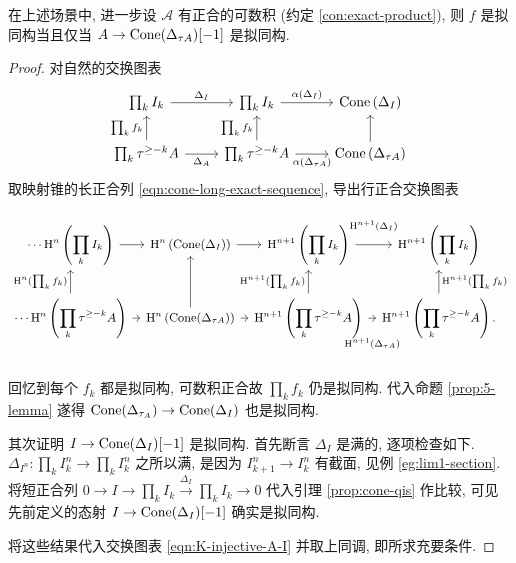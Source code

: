 \begin{lemma}\label{prop:K-injective-equiv}
	在上述场景中, 进一步设 $\mathcal{A}$ 有正合的可数积 (约定 \ref{con:exact-product}), 则 $f$ 是拟同构当且仅当 $A \to \operatorname{Cone}(\Delta_{\tau A})[-1]$ 是拟同构.
\end{lemma}
\begin{proof}
	对自然的交换图表
	\[\begin{tikzcd}
		\prod_k I_k \arrow[r, "\Delta_I"] & \prod_k I_k \arrow[r, "{\alpha(\Delta_I)}"] & \Cone\left(\Delta_I\right) \\
		\prod_k \tau^{\geq -k} A \arrow[r, "\Delta_A"'] \arrow[u, "{\prod_k f_k}"] & \prod_k \tau^{\geq -k} A \arrow[u, "{\prod_k f_k}"] \arrow[r, "{\alpha(\Delta_{\tau A})}"'] & \Cone\left( \Delta_{\tau A} \right) \arrow[u]
	\end{tikzcd}\]
	取映射锥的长正合列 \eqref{eqn:cone-long-exact-sequence}, 导出行正合交换图表
	\[\begin{tikzcd}
		[column sep=tiny, every cell/.append style = {font = \small}]
		\cdots \Hm^n\left( \displaystyle\prod_k I_k \right) \arrow[r] & \Hm^n\left( \Cone(\Delta_I) \right) \arrow[r] & \Hm^{n+1}\left( \displaystyle\prod_k I_k \right) \arrow[r, "{\Hm^{n+1}(\Delta_I)}" inner sep=1em] & \Hm^{n+1}\left( \displaystyle\prod_k I_k \right) \\
		\cdots \Hm^n\left( \displaystyle\prod_k \tau^{\geq -k} A \right) \arrow[r] \arrow[u, "{\Hm^n(\prod_k f_k)}"] & \Hm^n\left( \Cone(\Delta_{\tau A}) \right) \arrow[r] \arrow[u] & \Hm^{n+1}\left(\displaystyle\prod_k \tau^{\geq -k} A \right) \arrow[u, "{\Hm^{n+1}(\prod_k f_k)}"] \arrow[r, "{\Hm^{n+1}(\Delta_{\tau A})}"' inner sep=1.5em] & \Hm^{n+1}\left( \displaystyle\prod_k \tau^{\geq -k} A \right) \arrow[u, "{\Hm^{n+1}(\prod_k f_k)}"'] .
	\end{tikzcd}\]
	回忆到每个 $f_k$ 都是拟同构, 可数积正合故 $\prod_k f_k$ 仍是拟同构. 代入命题 \ref{prop:5-lemma} 遂得 $\operatorname{Cone}(\Delta_{\tau_A}) \to \operatorname{Cone}(\Delta_I)$ 也是拟同构.
	
	其次证明 $I \to \operatorname{Cone}(\Delta_I)[-1]$ 是拟同构. 首先断言 $\Delta_I$ 是满的, 逐项检查如下. $\Delta_{I^n}: \prod_k I_k^n \to \prod_k I_k^n$ 之所以满, 是因为 $I_{k+1}^n \to I_k^n$ 有截面, 见例 \ref{eg:lim1-section}. 将短正合列 $0 \to I \to \prod_k I_k \xrightarrow{\Delta_I} \prod_k I_k \to 0$ 代入引理 \ref{prop:cone-qis} 作比较, 可见先前定义的态射 $I \to \operatorname{Cone}(\Delta_I)[-1]$ 确实是拟同构.
	
	将这些结果代入交换图表 \eqref{eqn:K-injective-A-I} 并取上同调, 即所求充要条件.
\end{proof}

